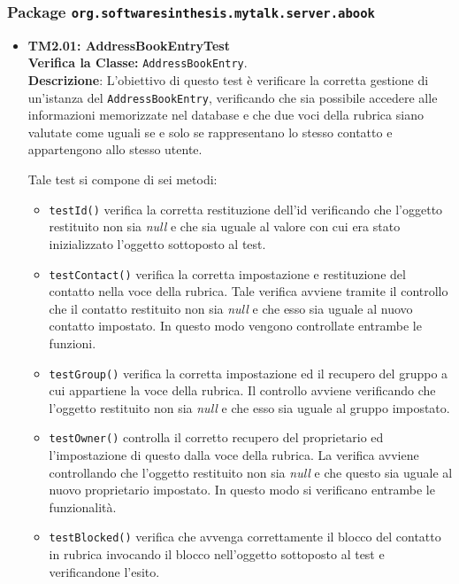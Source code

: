 \subsubsection{Package \texttt{org.softwaresinthesis.mytalk.server.abook}}
\begin{itemize}
\item \textbf{TM2.01: AddressBookEntryTest}\\
\textbf{Verifica la Classe:} \texttt{AddressBookEntry}.\\
\textbf{Descrizione}: L'obiettivo di questo test è verificare la corretta gestione di un'istanza del  \texttt{AddressBookEntry}, verificando che sia possibile accedere alle informazioni memorizzate nel database e che due voci della rubrica siano valutate come uguali se e solo se rappresentano lo stesso contatto e appartengono allo stesso utente.

Tale test si compone di sei metodi:
\begin{itemize}

\item \texttt{testId()} verifica la corretta restituzione dell'id verificando che l'oggetto restituito non sia \textit{null} e che sia uguale al valore con cui era stato inizializzato l'oggetto sottoposto al test.

\item \texttt{testContact()} verifica la corretta impostazione e restituzione del contatto nella voce della rubrica. Tale verifica avviene tramite il controllo che il contatto restituito non sia \textit{null} e che esso sia uguale al nuovo contatto impostato. In questo modo vengono controllate entrambe le funzioni.

\item \texttt{testGroup()} verifica la corretta impostazione ed il recupero del gruppo a cui appartiene la voce della rubrica. Il controllo avviene verificando che l'oggetto restituito non sia \textit{null} e che esso sia uguale al gruppo impostato. 

\item \texttt{testOwner()} controlla il corretto recupero del proprietario ed l'impostazione di questo dalla voce della rubrica. La verifica avviene controllando che l'oggetto restituito non sia \textit{null} e che questo sia uguale al nuovo proprietario impostato. In questo modo si verificano entrambe le funzionalità.

\item \texttt{testBlocked()} verifica che avvenga correttamente il blocco del contatto in rubrica invocando il blocco nell'oggetto sottoposto al test e verificandone l'esito.


\end{itemize}
\end{itemize}
